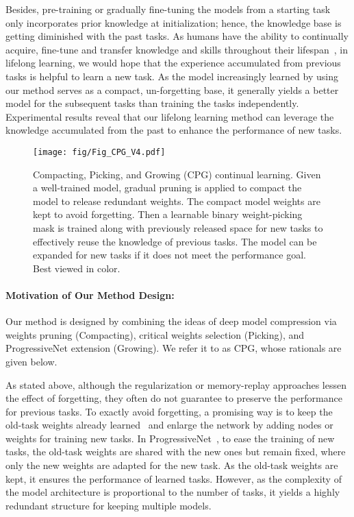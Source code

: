 \documentclass{article}
\begin{document}
Besides, pre-training or gradually fine-tuning the models from a starting task only incorporates prior knowledge at initialization; hence, the knowledge base is getting diminished with the past tasks.
As humans have the ability to continually acquire, fine-tune and transfer knowledge and skills throughout their lifespan~\cite{lifelong_review19}, in lifelong learning, we would hope that the experience accumulated from previous tasks is helpful to learn a new task.
As the model increasingly learned by using our method serves as a compact, un-forgetting base, it generally yields a better model for the subsequent tasks than training the tasks independently.
Experimental results reveal that our lifelong learning method can leverage the knowledge accumulated from the past to enhance the performance of new tasks.






\begin{figure}[t]
  \begin{center}
\texttt{[image: fig/Fig\_CPG\_V4.pdf]}
  \end{center}
  \vspace{-5pt}
  \caption{Compacting, Picking, and Growing (CPG) continual learning. Given a well-trained model, gradual pruning is applied to compact the model to release redundant weights. The compact model weights are kept to avoid forgetting. Then a learnable binary weight-picking mask is trained along with previously released space for new tasks to effectively reuse the knowledge of previous tasks. The model can be expanded for new tasks if it does not meet the performance goal. Best viewed in color. }
  \label{fig:overview}
  \vspace{-5pt}
\end{figure}



\paragraph{Motivation of Our Method Design:}
Our method is designed by combining the ideas of deep model compression via weights pruning (Compacting), critical weights selection (Picking), and ProgressiveNet extension (Growing).
We refer it to as CPG, whose rationals are given below.

As stated above, although the regularization or memory-replay approaches lessen the effect of forgetting, they often do not guarantee to preserve the performance for previous tasks. 
To exactly avoid forgetting, a promising way is to keep the old-task weights already learned~\cite{rusu2016progressive,xiao2014error} and enlarge the network by adding nodes or weights for training new tasks. 
In ProgressiveNet~\cite{rusu2016progressive}, to ease the training of new tasks, the old-task weights are shared with the new ones but remain fixed, where only the new weights are adapted for the new task. 
As the old-task weights are kept, it ensures the performance of learned tasks.
However, as the complexity of the model architecture is proportional to the number of tasks, it yields a highly redundant structure for keeping multiple models.
\end{document}
